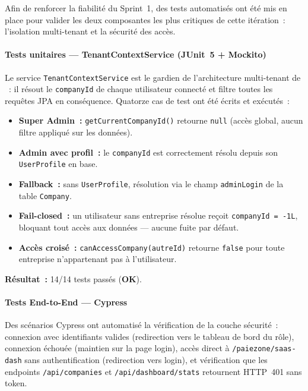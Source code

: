 Afin de renforcer la fiabilité du Sprint~1, des tests automatisés ont été
mis en place pour valider les deux composantes les plus critiques de cette
itération~: l'isolation multi-tenant et la sécurité des accès.

\paragraph{Tests unitaires --- TenantContextService (JUnit~5 + Mockito)}
Le service \texttt{TenantContextService} est le gardien de l'architecture
multi-tenant de \pz{}~: il résout le \texttt{companyId} de chaque utilisateur
connecté et filtre toutes les requêtes JPA en conséquence. Quatorze cas de test
ont été écrits et exécutés~:

\begin{itemize}[label=\textbullet, leftmargin=0.6cm, itemsep=2pt]
    \item \textbf{Super Admin~:} \texttt{getCurrentCompanyId()} retourne \texttt{null}
    (accès global, aucun filtre appliqué sur les données).
    \item \textbf{Admin avec profil~:} le \texttt{companyId} est correctement résolu
    depuis son \texttt{UserProfile} en base.
    \item \textbf{Fallback~:} sans \texttt{UserProfile}, résolution via le champ
    \texttt{adminLogin} de la table \texttt{Company}.
    \item \textbf{Fail-closed~:} un utilisateur sans entreprise résolue reçoit
    \texttt{companyId = -1L}, bloquant tout accès aux données --- aucune fuite
    par défaut.
    \item \textbf{Accès croisé~:} \texttt{canAccessCompany(autreId)} retourne
    \texttt{false} pour toute entreprise n'appartenant pas à l'utilisateur.
\end{itemize}

\textbf{Résultat~:} 14/14 tests passés (\textcolor{green!60!black}{\textbf{OK}}).

\paragraph{Tests End-to-End --- Cypress}
Des scénarios Cypress ont automatisé la vérification de la couche sécurité~:
connexion avec identifiants valides (redirection vers le tableau de bord du rôle),
connexion échouée (maintien sur la page login), accès direct à \texttt{/paiezone/saas-dash}
sans authentification (redirection vers login), et vérification que les endpoints
\texttt{/api/companies} et \texttt{/api/dashboard/stats} retournent HTTP~401 sans token.

